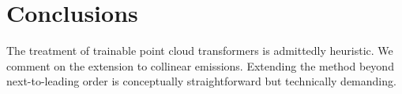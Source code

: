 \section{Conclusions}\label{sec:conclusions}

The treatment of trainable point cloud transformers is admittedly
heuristic. We comment on the extension to collinear emissions. Extending
the method beyond next-to-leading order is conceptually straightforward
but technically demanding.

